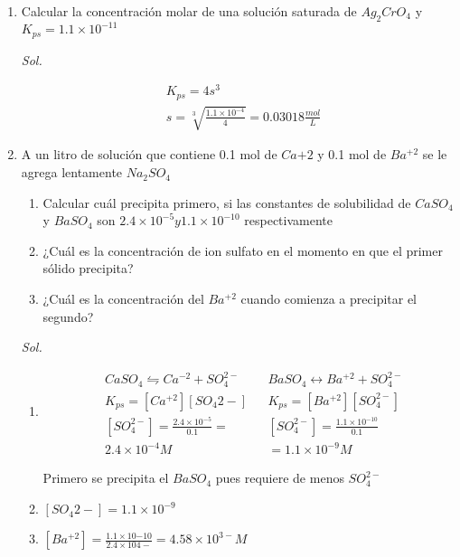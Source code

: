 \begin{enumerate}
	\item Calcular la concentración molar de una solución saturada de $Ag_2CrO_4$ y $K_{ps}=1.1\times 10^{-11}$

	      \textit{ Sol. }

	      \begin{align*}
		       & K_{ps}=4s^3                                                  \\
		       & s=\sqrt[3]{\frac{1.1\times 10^{-4}}{4}}=0.03018\frac{mol}{L}
	      \end{align*}

	\item A un litro de solución que contiene 0.1 mol de $Ca{+2}$ y 0.1 mol de $Ba^{+2}$ se le agrega lentamente $Na_2SO_4$

	      \begin{enumerate}
		      \item Calcular cuál precipita primero, si las constantes de solubilidad de $CaSO_4$ y $BaSO_4$ son $2.4\times 10^{-5} y 1.1\times10^{-10}$ respectivamente
		      \item ¿Cuál es la concentración de ion sulfato en el momento en que el primer sólido precipita?
		      \item ¿Cuál es la concentración del $Ba^{+2}$ cuando comienza a precipitar el segundo?
	      \end{enumerate}

	      \textit{ Sol. }


	      \begin{enumerate}
		      \item \begin{align*}
			             & CaSO_4\leftrightharpoons Ca^{-2}+SO_4^{2-} &  & BaSO_4\longleftrightarrow Ba^{+2}+SO_4^{2-} \\
			             & K_{ps}=[Ca^{+2}][SO_4{2-}]                 &  & K_{ps}=[Ba^{+2}][SO_4^{2-}]                 \\
			             & [SO_4^{2-}]=\frac{2.4\times10^{-5}}{0.1}=  &  & [SO_4^{2-}]=\frac{1.1\times10^{-10}}{0.1}   \\&2.4\times10^{-4}M &&=1.1\times 10^{-9}M
		            \end{align*}

		            Primero se precipita el $BaSO_4$ pues requiere de menos $SO_4^{2-}$
		      \item $[SO_4{2-}]=1.1\times10^{-9}$
		      \item $[Ba^{+2}]=\frac{1.1\times10{-10}}{2.4\times10{4-}}=4.58\times10^{3-}M$
	      \end{enumerate}


\end{enumerate}
